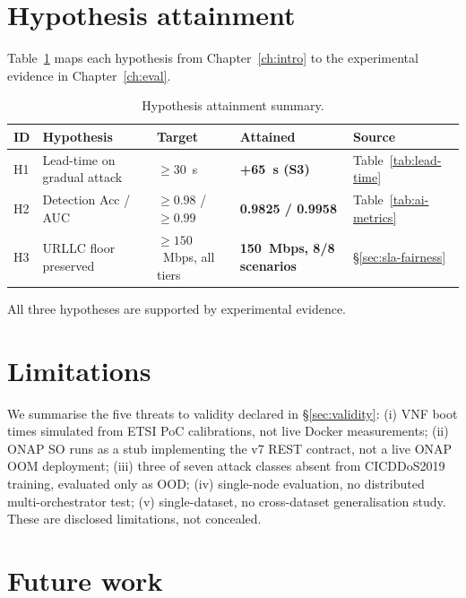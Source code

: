 \section{Hypothesis attainment}
\label{sec:kpi}

Table~\ref{tab:hypotheses} maps each hypothesis from Chapter~\ref{ch:intro}
to the experimental evidence in Chapter~\ref{ch:eval}.

\begin{table}[H]
\centering
\small
\caption{Hypothesis attainment summary.}
\label{tab:hypotheses}
\begin{tabular}{@{}lllll@{}}
\toprule
ID & Hypothesis & Target & Attained & Source \\
\midrule
H1 & Lead-time on gradual attack & $\geq 30$~s & \textbf{+65~s (S3)} &
     Table~\ref{tab:lead-time} \\
H2 & Detection Acc / AUC & $\geq 0.98$ / $\geq 0.99$ & \textbf{0.9825 / 0.9958} &
     Table~\ref{tab:ai-metrics} \\
H3 & URLLC floor preserved & $\geq 150$~Mbps, all tiers &
     \textbf{150~Mbps, 8/8 scenarios} & \S\ref{sec:sla-fairness} \\
\bottomrule
\end{tabular}
\end{table}

All three hypotheses are supported by experimental evidence.

\section{Limitations}

We summarise the five threats to validity declared in
\S\ref{sec:validity}:
(i) VNF boot times simulated from ETSI PoC calibrations, not live
Docker measurements;
(ii) ONAP SO runs as a stub implementing the v7 REST contract, not
a live ONAP OOM deployment;
(iii) three of seven attack classes absent from CICDDoS2019 training,
evaluated only as OOD;
(iv) single-node evaluation, no distributed multi-orchestrator test;
(v) single-dataset, no cross-dataset generalisation study.
These are disclosed limitations, not concealed.

\section{Future work}
\label{sec:future}

